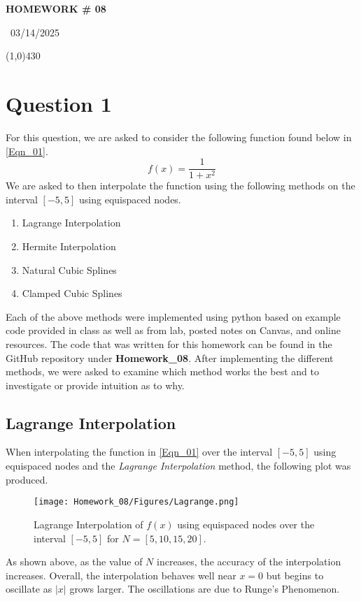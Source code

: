 \documentclass{article}
\begin{document}
\begin{center}
 \LARGE\bfseries HOMEWORK \# 08
\end{center}
\begin{center}
    ~03/14/2025~
\end{center}
 \line(1,0){430}

\section{Question 1}
For this question, we are asked to consider the following function found below in \ref{Eqn_01}.
\begin{equation}
    \label{Eqn_01}
    f(x) = \frac{1}{1+x^2}
\end{equation}
We are asked to then interpolate the function using the following methods on the interval \([-5,5]\) using equispaced nodes.
\begin{enumerate}
    \item Lagrange Interpolation
    \item Hermite Interpolation
    \item Natural Cubic Splines
    \item Clamped Cubic Splines
\end{enumerate}
Each of the above methods were implemented using python based on example code provided in class as well as from lab, posted notes on Canvas, and online resources. The code that was written for this homework can be found in the GitHub repository under \textbf{Homework\_08}.
After implementing the different methods, we were asked to examine which method works the best and to investigate or provide intuition as to why.
\newpage
\subsection{Lagrange Interpolation}
When interpolating the function in \ref{Eqn_01} over the interval \([-5,5]\) using equispaced nodes and the \textit{Lagrange Interpolation} method, the following plot was produced.
\begin{figure}[h!]
    \centering
    \texttt{[image: Homework\_08/Figures/Lagrange.png]}
    \caption{Lagrange Interpolation of \(f(x)\) using equispaced nodes over the interval \([-5,5]\) for \(N = [5,10,15,20]\).}
    \label{fig:Lagrange}
\end{figure}
As shown above, as the value of \(N\) increases, the accuracy of the interpolation increases. Overall, the interpolation behaves well near \(x=0\) but begins to oscillate as \(|x|\) grows larger. The oscillations are due to Runge's Phenomenon.
\newpage
\end{document}
